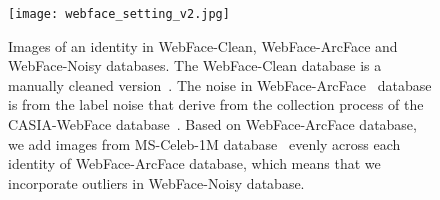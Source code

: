 \documentclass[journal,comsoc]{IEEEtran}
\begin{document}
  
\begin{figure}[htbp]
	\center
	\texttt{[image: webface\_setting\_v2.jpg]}
	\caption{Images of an identity in WebFace-Clean, WebFace-ArcFace and WebFace-Noisy databases. The WebFace-Clean database is a manually cleaned version~\cite{rwebface_wang,deng2019arcface}. The noise in WebFace-ArcFace~\cite{deng2019arcface} database is from the label noise that derive from the collection process of the CASIA-WebFace database~\cite{Yi2014CASIA}. Based on WebFace-ArcFace database, we add images from MS-Celeb-1M database~\cite{guo2016msceleb} evenly across each identity of WebFace-ArcFace database, which means that we incorporate outliers in WebFace-Noisy database.}
	\label{fig:web-noise}
\end{figure}

\begin{table}[htbp]
	\renewcommand\arraystretch{1.05}
	\begin{center}
		\caption{Study on the choice of hype-parameters  and  of SFace (ResNet34). As the noise level increases, parameter  should be larger, \emph{i.e}.  curves should move to the right, which indicates that the speed of intra-class is decreased more early to prevent overfitting.}
		\label{table:parameters}
\end{center}
\end{table}
\end{document}
